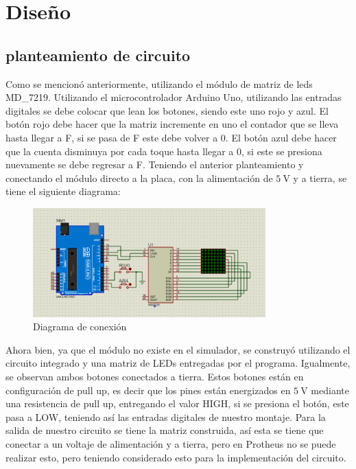 \section{Diseño}

\subsection{planteamiento de circuito}
Como se mencionó anteriormente, utilizando el módulo de matriz de leds MD\_7219.
Utilizando el microcontrolador Arduino Uno, utilizando las entradas digitales se debe 
colocar que lean los botones, siendo este uno rojo y azul. El botón rojo debe hacer que la matriz 
incremente en uno el contador que se lleva hasta llegar a F, si se pasa de F este debe volver a 0. El botón
azul debe hacer que la cuenta disminuya por cada toque hasta llegar a 0, si este se presiona nuevamente se debe
regresar a F. Teniendo el anterior planteamiento y conectando el módulo directo a la placa, con la alimentación
de $\SI{5}{\volt}$ y a tierra, se tiene el siguiente diagrama:
\begin{figure}[h!]
    \centering
    \includegraphics[width=0.8\textwidth]{Diagramas/Diagrama.png}
    \caption{Diagrama de conexión}
    \label{fig:conexion}
\end{figure}

Ahora bien, ya que el módulo no existe en el simulador, se construyó utilizando el circuito integrado y una matriz de LEDs entregadas por el programa. Igualmente, se observan ambos botones conectados a tierra. Estos botones están en configuración de pull up, es decir que los pines están energizados en $\SI{5}{\volt}$ mediante una resistencia de pull up, entregando el valor HIGH,
si se presiona el botón, este pasa a LOW, teniendo así las entradas digitales de nuestro montaje. Para la salida de nuestro circuito 
se tiene la matriz construida, así esta se tiene que conectar a un voltaje de alimentación y a tierra, pero en Protheus no se puede realizar esto, 
pero teniendo considerado esto para la implementación del circuito.

